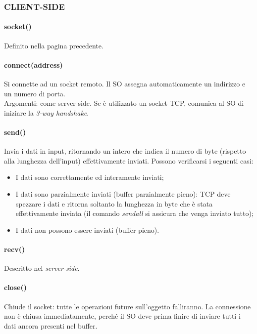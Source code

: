\hspace{8mm}
\begin{minipage}[t]{0.45\textwidth}
    \subsubsection{CLIENT-SIDE}
    \paragraph{socket()}
    Definito nella pagina precedente.

    \paragraph{connect(address)} Si connette ad un socket remoto. Il SO assegna automaticamente un indirizzo e un numero di porta.\\
    Argomenti: come server-side.
    Se è utilizzato un socket TCP, comunica al SO di iniziare la \textit{3-way handshake}.

    \paragraph{send()}
    Invia i dati in input, ritornando un intero che indica il numero di byte (rispetto alla lunghezza dell'input) effettivamente inviati. Possono verificarsi i seguenti casi:
    \begin{itemize}
        \item I dati sono correttamente ed interamente inviati;
        \item I dati sono parzialmente inviati (buffer parzialmente pieno): TCP deve spezzare i dati e ritorna soltanto la lunghezza in byte che è stata effettivamente inviata (il comando \textit{sendall} si assicura che venga inviato tutto);
        \item I dati non possono essere inviati (buffer pieno).
    \end{itemize}

    \paragraph{recv()}
    Descritto nel \textit{server-side}.

    \paragraph{close()}
    Chiude il socket: tutte le operazioni future sull'oggetto falliranno. La connessione non è chiusa immediatamente, perché il SO deve prima finire di inviare tutti i dati ancora presenti nel buffer.
\end{minipage}

